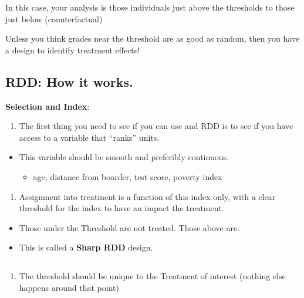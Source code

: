 \documentclass[
  letterpaper,
  DIV=11,
  numbers=noendperiod]{scrartcl}
\providecommand{\tightlist}{%
  \setlength{\itemsep}{0pt}\setlength{\parskip}{0pt}}\usepackage{longtable,booktabs,array}
\begin{document}
In this case, your analysis is those individuals just above the
thresholds to those just below (counterfactual)

Unless you think grades near the threshold are as good as random, then
you have a design to identify treatment effects!

\subsection{RDD: How it works.}\label{rdd-how-it-works.}

\textbf{Selection and Index}:

\begin{enumerate}
\def\labelenumi{\arabic{enumi}.}
\tightlist
\item
  The first thing you need to see if you can use and RDD is to see if
  you have access to a variable that ``ranks'' units.
\end{enumerate}

\begin{itemize}
\tightlist
\item
  This variable should be smooth and preferibly continuous.

  \begin{itemize}
  \tightlist
  \item
    age, distance from boarder, test score, poverty index
  \end{itemize}
\end{itemize}

\begin{enumerate}
\def\labelenumi{\arabic{enumi}.}
\setcounter{enumi}{1}
\tightlist
\item
  Assignment into treatment is a function of this index only, with a
  clear threshold for the index to have an impact the treatment.
\end{enumerate}

\begin{itemize}
\tightlist
\item
  Those under the Threshold are not treated. Those above are.
\item
  This is called a \textbf{Sharp RDD} design.
\end{itemize}

\subsection{}\label{section-1}

\begin{enumerate}
\def\labelenumi{\arabic{enumi}.}
\setcounter{enumi}{2}
\tightlist
\item
  The threshold should be unique to the Treatment of interest (nothing
  else happens around that point)
\end{enumerate}
\end{document}
